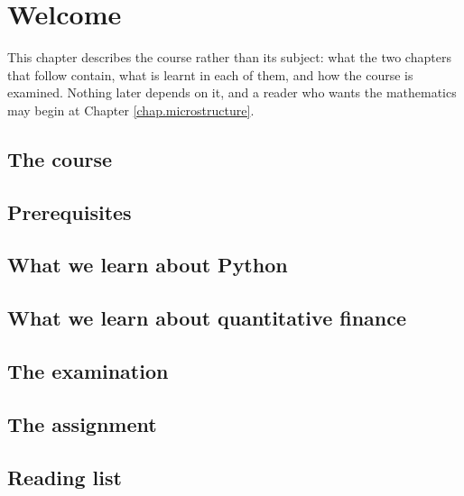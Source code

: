 \chapter{Welcome}
\label{chap.welcome}

This chapter describes the course rather than its subject:
what the two chapters that follow contain,
what is learnt in each of them,
and how the course is examined.
Nothing later depends on it,
and a reader who wants the mathematics may begin at
Chapter \ref{chap.microstructure}.

\section{The course}
\label{sec.theCourse}


\section{Prerequisites}
\label{sec.prerequisites}


\section{What we learn about Python}
\label{sec.learningPython}


\section{What we learn about quantitative finance}
\label{sec.learningFinance}


\section{The examination}
\label{sec.examination}


\section{The assignment}
\label{sec.assignments}


\section{Reading list}
\label{sec.readingList}

